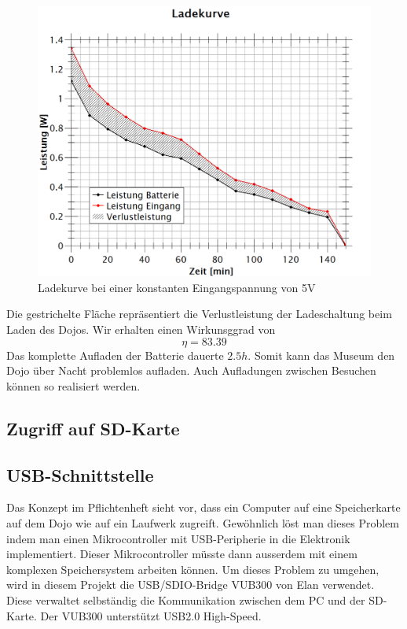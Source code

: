 \begin{figure}[h]
	\centering
	\includegraphics[width=\textwidth]{graphics/ladekurve.png}
	\caption{Ladekurve bei einer konstanten Eingangspannung von 5V}
	\label{fig:Ladeleistung}
\end{figure}

Die gestrichelte Fläche repräsentiert die Verlustleistung der Ladeschaltung beim Laden des Dojos.
Wir erhalten einen Wirkunsggrad von
\begin{equation}
\eta = 83.39%
\end{equation}
Das komplette Aufladen der Batterie dauerte $2.5h$. Somit kann das Museum den Dojo über Nacht problemlos aufladen. Auch Aufladungen zwischen Besuchen können so realisiert werden.
\clearpage

\subsection{Zugriff auf SD-Karte}


\subsection{USB-Schnittstelle}
Das Konzept im Pflichtenheft sieht vor, dass ein Computer auf eine Speicherkarte auf dem Dojo wie auf ein Laufwerk zugreift. Gewöhnlich löst man dieses Problem indem man einen Mikrocontroller mit USB-Peripherie in die Elektronik implementiert.
Dieser Mikrocontroller müsste dann ausserdem mit einem komplexen Speichersystem arbeiten können. Um dieses Problem zu umgehen, wird in diesem Projekt die USB/SDIO-Bridge VUB300 von Elan verwendet. Diese verwaltet selbständig die Kommunikation zwischen dem PC und der SD-Karte.
Der VUB300 unterstützt USB2.0 High-Speed. 

